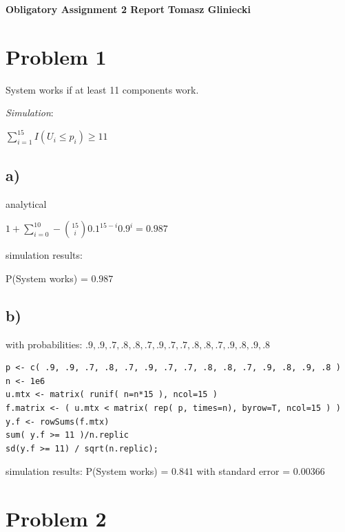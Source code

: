 \documentclass[a4paper, 11pt]{article}
\begin{document}
\noindent
\large\textbf{Obligatory Assignment 2 Report} \hfill \textbf{Tomasz Gliniecki} \\


\section*{Problem 1}
System works if at least 11 components work.

\emph{Simulation}:
\\

\centerline{$ \sum_{i=1}^{15} I (U_i \leq p_i) \geq 11 $}

\subsection*{a)}
analytical\\
\centerline{$1+\sum_{i=0}^{10} - \binom{15}{i} 0.1^{15-i} 0.9^i = 0.987 $}
simulation results:\\
\centerline{P(System works) = $ 0.987 $}

\subsection*{b)}

\centerline{with probabilities: $.9, .9, .7, .8, .8, .7, .9, .7, .7, .8, .8, .7, .9, .8, .9, .8$}

\begin{lstlisting}
p <- c( .9, .9, .7, .8, .7, .9, .7, .7, .8, .8, .7, .9, .8, .9, .8 )
n <- 1e6
u.mtx <- matrix( runif( n=n*15 ), ncol=15 )
f.matrix <- ( u.mtx < matrix( rep( p, times=n), byrow=T, ncol=15 ) )
y.f <- rowSums(f.mtx)
sum( y.f >= 11 )/n.replic
sd(y.f >= 11) / sqrt(n.replic);
\end{lstlisting}


simulation results: P(System works) = $0.841$ with standard error = $0.00366$


\section*{Problem 2}
\end{document}
